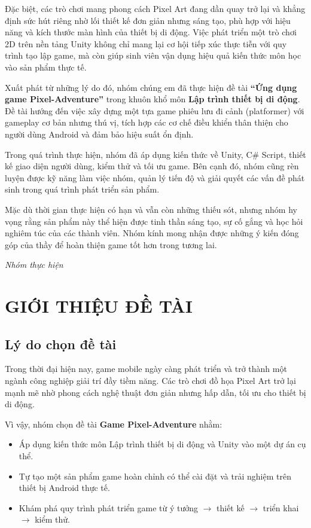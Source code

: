 \documentclass[a4paper,12pt]{article}
\begin{document}
Đặc biệt, các trò chơi mang phong cách Pixel Art đang dần quay trở lại và khẳng định sức hút riêng nhờ lối thiết kế đơn giản nhưng sáng tạo, phù hợp với hiệu năng và kích thước màn hình của thiết bị di động. Việc phát triển một trò chơi 2D trên nền tảng Unity không chỉ mang lại cơ hội tiếp xúc thực tiễn với quy trình tạo lập game, mà còn giúp sinh viên vận dụng hiệu quả kiến thức môn học vào sản phẩm thực tế.

Xuất phát từ những lý do đó, nhóm chúng em đã thực hiện đề tài \textbf{“Ứng dụng game Pixel-Adventure”} trong khuôn khổ môn \textbf{Lập trình thiết bị di động}. Đề tài hướng đến việc xây dựng một tựa game phiêu lưu đi cảnh (platformer) với gameplay cơ bản nhưng thú vị, tích hợp các cơ chế điều khiển thân thiện cho người dùng Android và đảm bảo hiệu suất ổn định.

Trong quá trình thực hiện, nhóm đã áp dụng kiến thức về Unity, C\# Script, thiết kế giao diện người dùng, kiểm thử và tối ưu game. Bên cạnh đó, nhóm cũng rèn luyện được kỹ năng làm việc nhóm, quản lý tiến độ và giải quyết các vấn đề phát sinh trong quá trình phát triển sản phẩm.

Mặc dù thời gian thực hiện có hạn và vẫn còn những thiếu sót, nhưng nhóm hy vọng rằng sản phẩm này thể hiện được tinh thần sáng tạo, sự cố gắng và học hỏi nghiêm túc của các thành viên. Nhóm kính mong nhận được những ý kiến đóng góp của thầy để hoàn thiện game tốt hơn trong tương lai.

\vspace{0.5cm}
\hfill \textit{Nhóm thực hiện}

\newpage

\section{GIỚI THIỆU ĐỀ TÀI}

\subsection{Lý do chọn đề tài}

Trong thời đại hiện nay, game mobile ngày càng phát triển và trở thành một ngành công nghiệp giải trí đầy tiềm năng. Các trò chơi đồ họa Pixel Art trở lại mạnh mẽ nhờ phong cách nghệ thuật đơn giản nhưng hấp dẫn, tối ưu cho thiết bị di động.

Vì vậy, nhóm chọn đề tài \textbf{Game Pixel-Adventure} nhằm:
\begin{itemize}
    \item Áp dụng kiến thức môn Lập trình thiết bị di động và Unity vào một dự án cụ thể.
    \item Tự tạo một sản phẩm game hoàn chỉnh có thể cài đặt và trải nghiệm trên thiết bị Android thực tế.
    \item Khám phá quy trình phát triển game từ ý tưởng $\rightarrow$ thiết kế $\rightarrow$ triển khai $\rightarrow$ kiểm thử.
\end{itemize}
\end{document}
